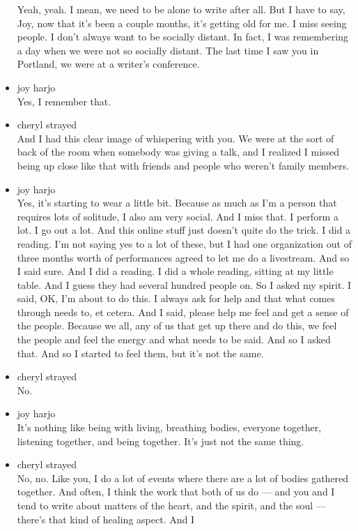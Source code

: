 \begin{itemize}
  Yeah, yeah. I mean, we need to be alone to write after all. But I have
  to say, Joy, now that it's been a couple months, it's getting old for
  me. I miss seeing people. I don't always want to be socially distant.
  In fact, I was remembering a day when we were not so socially distant.
  The last time I saw you in Portland, we were at a writer's conference.
\item
  joy harjo\\
  Yes, I remember that.
\item
  cheryl strayed\\
  And I had this clear image of whispering with you. We were at the sort
  of back of the room when somebody was giving a talk, and I realized I
  missed being up close like that with friends and people who weren't
  family members.
\item
  joy harjo\\
  Yes, it's starting to wear a little bit. Because as much as I'm a
  person that requires lots of solitude, I also am very social. And I
  miss that. I perform a lot. I go out a lot. And this online stuff just
  doesn't quite do the trick. I did a reading. I'm not saying yes to a
  lot of these, but I had one organization out of three months worth of
  performances agreed to let me do a livestream. And so I said sure. And
  I did a reading. I did a whole reading, sitting at my little table.
  And I guess they had several hundred people on. So I asked my spirit.
  I said, OK, I'm about to do this. I always ask for help and that what
  comes through needs to, et cetera. And I said, please help me feel and
  get a sense of the people. Because we all, any of us that get up there
  and do this, we feel the people and feel the energy and what needs to
  be said. And so I asked that. And so I started to feel them, but it's
  not the same.
\item
  cheryl strayed\\
  No.
\item
  joy harjo\\
  It's nothing like being with living, breathing bodies, everyone
  together, listening together, and being together. It's just not the
  same thing.
\item
  cheryl strayed\\
  No, no. Like you, I do a lot of events where there are a lot of bodies
  gathered together. And often, I think the work that both of us do ---
  and you and I tend to write about matters of the heart, and the
  spirit, and the soul --- there's that kind of healing aspect. And I

\end{itemize}
